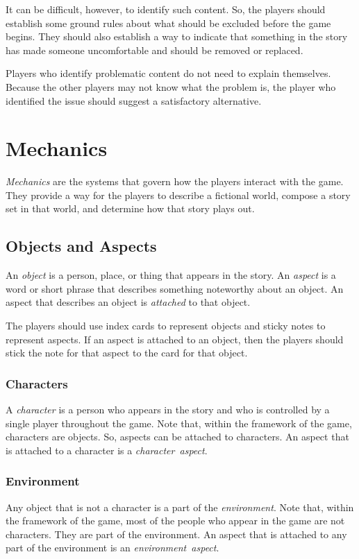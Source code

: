 \documentclass[12pt, a5paper, parskip=half-]{scrartcl}
\begin{document}
It can be difficult, however,  to identify such content. 
So, the players should establish some ground rules about what should be excluded before the game begins. 
They should also establish a way to indicate that something in the story has made someone uncomfortable and should be removed or replaced.

Players who identify problematic content do not need to explain themselves.
Because the other players may not know what the problem is, the player who identified the issue should suggest a satisfactory alternative.

\newpage

\section*{Mechanics}  \label{section:mechanics}
\emph{Mechanics} are the systems that govern how the players interact with the game.
They provide a way for the players to describe a fictional world, compose a story set in that world, and determine how that story plays out.

\subsection*{Objects and Aspects} \label{subsection:objects-and-aspects}
An \emph{object} is a person, place, or thing that appears in the story.
An \emph{aspect} is a word or short phrase that describes something noteworthy about an object.
An aspect that describes an object is \emph{attached} to that object.

The players should use index cards to represent objects and sticky notes to represent aspects. 
If an aspect is attached to an object, then the players should stick the note for that aspect to the card for that object.

\subsubsection*{Characters} \label{subsubsection:characters}
A \emph{character} is a person who appears in the story and who  is controlled by a single player throughout the game. 
Note that, within the framework of the game, characters are objects.
So, aspects can be attached to characters.
An aspect that is attached to a character is a \emph{character~aspect}.

\subsubsection*{Environment} \label{subsubsectioon:environment}
Any object that is not a character is a part of the \emph{environment}.
Note that, within the framework of the game, most of the people who appear in the game are not characters.
They are part of the environment. 
An aspect that is attached to any part of the environment is an \emph{environment~aspect}.
\end{document}
